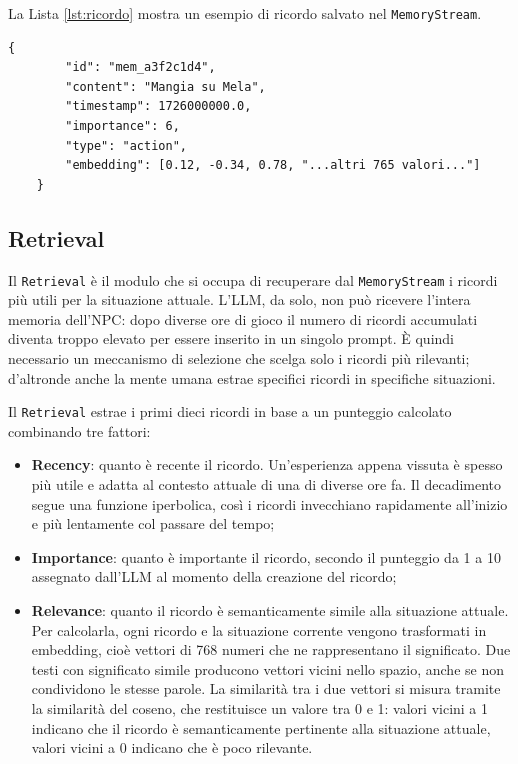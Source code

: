 La Lista \ref{lst:ricordo} mostra un esempio di ricordo salvato nel \texttt{MemoryStream}.

\begin{lstlisting}[style=jsonstyle, caption={Esempio di ricordo nel Memory Stream.}, label={lst:ricordo}]
	{
		"id": "mem_a3f2c1d4",
		"content": "Mangia su Mela",
		"timestamp": 1726000000.0,
		"importance": 6,
		"type": "action",
		"embedding": [0.12, -0.34, 0.78, "...altri 765 valori..."]
	}
\end{lstlisting}

\subsection{Retrieval}

Il \texttt{Retrieval} è il modulo che si occupa di recuperare dal \texttt{MemoryStream} i ricordi più utili per la situazione attuale. L'LLM, da solo, non può ricevere l'intera memoria dell'NPC: dopo diverse ore di gioco il numero di ricordi accumulati diventa troppo elevato per essere inserito in un singolo prompt. È quindi necessario un meccanismo di selezione che scelga solo i ricordi più rilevanti; d'altronde anche la mente umana estrae specifici ricordi in specifiche situazioni.

Il \texttt{Retrieval} estrae i primi dieci ricordi in base a un punteggio calcolato combinando tre fattori:

\begin{itemize}
	\item \textbf{Recency}: quanto è recente il ricordo. Un'esperienza appena vissuta è spesso più utile e adatta al contesto attuale di una di diverse ore fa. Il decadimento segue una funzione iperbolica, così i ricordi invecchiano rapidamente all'inizio e più lentamente col passare del tempo;
	\item \textbf{Importance}: quanto è importante il ricordo, secondo il punteggio da 1 a 10 assegnato dall'LLM al momento della creazione del ricordo;
 	\item \textbf{Relevance}: quanto il ricordo è semanticamente simile alla situazione attuale. Per calcolarla, ogni ricordo e la situazione corrente vengono trasformati in embedding, cioè vettori di 768 numeri che ne rappresentano il significato. Due testi con significato simile producono vettori vicini nello spazio, anche se non condividono le stesse parole. La similarità tra i due vettori si misura tramite la similarità del coseno, che restituisce un valore tra 0 e 1: valori vicini a 1 indicano che il ricordo è semanticamente pertinente alla situazione attuale, valori vicini a 0 indicano che è poco rilevante.
\end{itemize}

